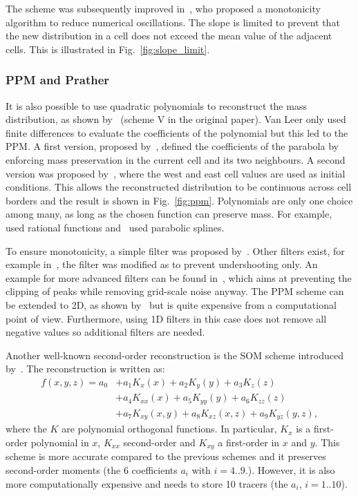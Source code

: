 The scheme was subsequently improved in~\cite{Leer1979}, who proposed a
monotonicity algorithm to reduce numerical oscillations. The slope is limited to
prevent that the new distribution in a cell does not exceed the mean value of the
adjacent cells. This is illustrated in Fig.~\ref{fig:slope_limit}.

\subsubsection{PPM and Prather}
It is also possible to use quadratic polynomials to reconstruct the mass
distribution, as shown by~\cite{Leer1977} (scheme V in the original paper). Van
Leer only used finite differences to evaluate the coefficients of the polynomial
but this led to the \gls{PPM}. A first version, proposed
by~\cite{Laprise1995}, defined the coefficients of the parabola by enforcing
mass preservation in the current cell and its two neighbours.  A second version
was proposed by~\cite{Colella1984}, where the west and east cell values are used
as initial conditions. This allows the reconstructed distribution to be
continuous across cell borders and the result is shown in
Fig.~\ref{fig:ppm}. Polynomials are only one choice among many, as long as the
chosen function can preserve mass. For example, \cite{Xiao2002} used rational
functions and~\cite{Zerroukat2002} used parabolic splines.

To ensure monotonicity, a simple filter was proposed by~\cite{Colella1984}.
Other filters exist, for example in~\cite{Lin1996}, the filter was modified as
to prevent undershooting only. An example for more advanced filters can be found
in~\cite{Zerroukat2005}, which aims at preventing the clipping of peaks while
removing grid-scale noise anyway.  The PPM scheme can be extended to 2D, as
shown by~\cite{Rancic1992} but is quite expensive from a computational point of
view. Furthermore, using 1D filters in this case does not remove all negative
values so additional filters are needed.

Another well-known second-order reconstruction is the \gls{SOM} scheme
introduced by~\cite{Prather1986}. The reconstruction is written as:
\begin{align*}
  f(x,y,z) = a_0 &+ a_1 K_x(x) + a_2 K_y(y) + a_3 K_z(z)\\
  & + a_4 K_{xx}(x) + a_5 K_{yy}(y) + a_6 K_{zz}(z)\\
  & + a_7 K_{xy}(x,y) + a_8 K_{xz}(x,z) + a_9 K_{yz}(y,z),
\end{align*}
where the $K$ are polynomial orthogonal functions. In particular, $K_x$ is a
first-order polynomial in $x$, $K_{xx}$ second-order and $K_{xy}$ a first-order
in $x$ and $y$. This scheme is more accurate compared to the previous schemes
and it preserves second-order moments (the 6 coefficients $a_i$ with $i=4..9$.).
However, it is also more computationally expensive and needs to store 10 tracers
(the $a_i$, $i=1..10$).

